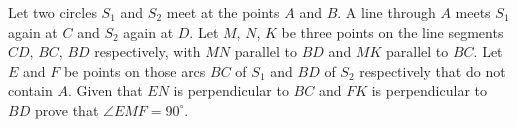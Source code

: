 \item[\textbf{G8.}]Let two circles $S_{1}$ and $S_{2}$ meet at the points $A$ and $B$. A line through $A$ meets $S_{1}$ again at $C$ and $S_{2}$ again at $D$. Let $M$,  $N$,  $K$ be three points on the line segments $CD$,  $BC$,  $BD$ respectively, with $MN$ parallel to $BD$ and $MK$ parallel to $BC$. Let $E$ and $F$ be points on those arcs $BC$ of $S_{1}$ and $BD$ of $S_{2}$ respectively that do not contain $A$. Given that $EN$ is perpendicular to $BC$ and $FK$ is perpendicular to $BD$ prove that $\angle EMF=90^{\circ}$.